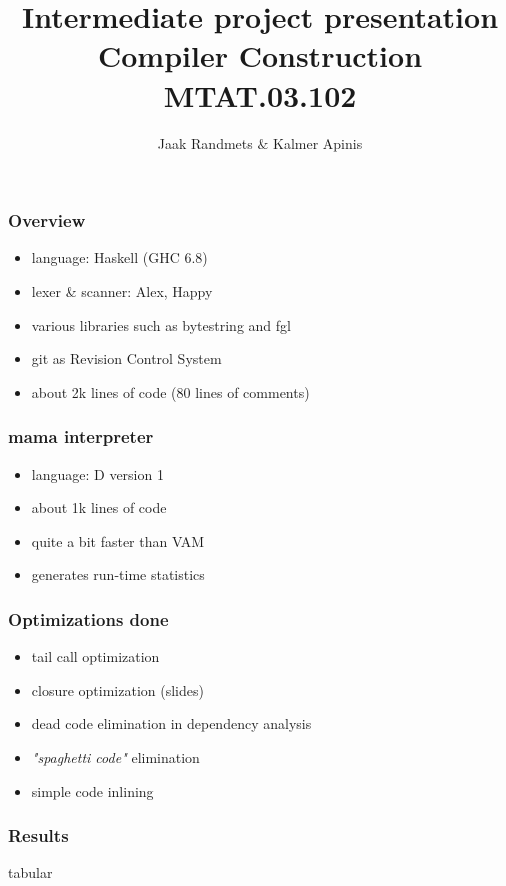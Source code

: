 \documentclass[14pt,xcolor=svgnames]{beamer}
\title[Tech Demo]{Intermediate project presentation \\ \small Compiler Construction MTAT.03.102}
\author{Jaak Randmets $\&$ Kalmer Apinis}
\institute[UT]{
  Department of Computer Science\\
  University of Tartu}
\date{}
\begin{document}

\maketitle

\begin{frame}
  \frametitle{Overview}
  \begin{itemize}
    \item language: Haskell (GHC 6.8)
    \item lexer \& scanner: Alex, Happy
    \item various libraries such as bytestring and fgl
    \item git as Revision Control System
    \item about 2k lines of code (80 lines of comments)
  \end{itemize}
\end{frame}


\begin{frame}
  \frametitle{mama interpreter}
  \begin{itemize}
    \item language: D version 1
    \item about 1k lines of code
    \item quite a bit faster than VAM
    \item generates run-time statistics
  \end{itemize}
\end{frame}

\begin{frame}
  \frametitle{Optimizations done}
  \begin{itemize}
    \item tail call optimization
    \item closure optimization (slides)
    \item dead code elimination in dependency analysis
    \item {\it "spaghetti code"} elimination
    \item simple code inlining
  \end{itemize}
\end{frame}

\begin{frame}
  \frametitle{Results}
  tabular
\end{frame}
\end{document}

